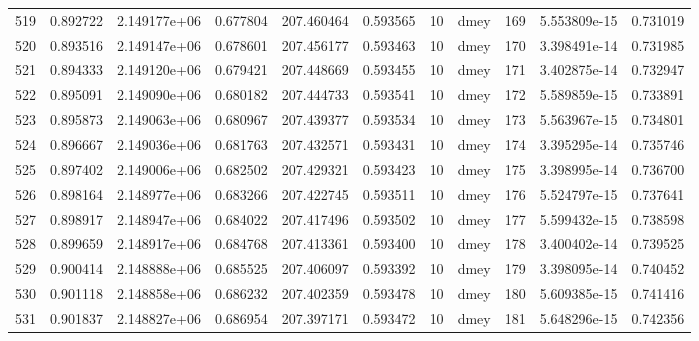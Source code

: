 \begin{tabular}{lrrrrrrlrrr}
519  &    0.892722 &        2.149177e+06 &  0.677804 &              207.460464 &    0.593565 &      10 &         dmey &    169 &   5.553809e-15 &      0.731019 \\
520  &    0.893516 &        2.149147e+06 &  0.678601 &              207.456177 &    0.593463 &      10 &         dmey &    170 &   3.398491e-14 &      0.731985 \\
521  &    0.894333 &        2.149120e+06 &  0.679421 &              207.448669 &    0.593455 &      10 &         dmey &    171 &   3.402875e-14 &      0.732947 \\
522  &    0.895091 &        2.149090e+06 &  0.680182 &              207.444733 &    0.593541 &      10 &         dmey &    172 &   5.589859e-15 &      0.733891 \\
523  &    0.895873 &        2.149063e+06 &  0.680967 &              207.439377 &    0.593534 &      10 &         dmey &    173 &   5.563967e-15 &      0.734801 \\
524  &    0.896667 &        2.149036e+06 &  0.681763 &              207.432571 &    0.593431 &      10 &         dmey &    174 &   3.395295e-14 &      0.735746 \\
525  &    0.897402 &        2.149006e+06 &  0.682502 &              207.429321 &    0.593423 &      10 &         dmey &    175 &   3.398995e-14 &      0.736700 \\
526  &    0.898164 &        2.148977e+06 &  0.683266 &              207.422745 &    0.593511 &      10 &         dmey &    176 &   5.524797e-15 &      0.737641 \\
527  &    0.898917 &        2.148947e+06 &  0.684022 &              207.417496 &    0.593502 &      10 &         dmey &    177 &   5.599432e-15 &      0.738598 \\
528  &    0.899659 &        2.148917e+06 &  0.684768 &              207.413361 &    0.593400 &      10 &         dmey &    178 &   3.400402e-14 &      0.739525 \\
529  &    0.900414 &        2.148888e+06 &  0.685525 &              207.406097 &    0.593392 &      10 &         dmey &    179 &   3.398095e-14 &      0.740452 \\
530  &    0.901118 &        2.148858e+06 &  0.686232 &              207.402359 &    0.593478 &      10 &         dmey &    180 &   5.609385e-15 &      0.741416 \\
531  &    0.901837 &        2.148827e+06 &  0.686954 &              207.397171 &    0.593472 &      10 &         dmey &    181 &   5.648296e-15 &      0.742356 \\

\end{tabular}

